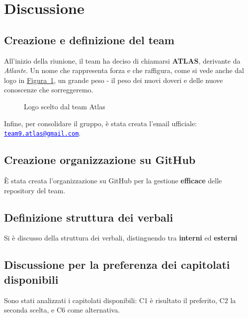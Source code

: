 \documentclass[a4paper,12pt]{article}
\makeatletter
\newcommand{\Email}{\href{mailto:team9.atlas@gmail.com}{\textcolor{blue}{\underline{team9.atlas@gmail.com}}}}
\newcommand{\LogoGruppo}{img/AtlasLogo.png} %
\makeatother
\begin{document}
\section{Discussione}{
    \subsection{Creazione e definizione del team}{
        All'inizio della riunione, il team ha deciso di chiamarsi \textbf{ATLAS}, derivante da \emph{Atlante}.  
        Un nome che rappresenta forza e che raffigura, come si vede anche dal logo in \hyperlink{logo-target}{Figura~\ref{fig:logo-atlas}}, un grande peso - il peso dei nuovi doveri e delle nuove conoscenze che sorreggeremo.

        \begin{figure}[h]
            \centering
            \hypertarget{logo-target}{}
            \caption{Logo scelto dal team Atlas}
            \label{fig:logo-atlas}
        \end{figure}

        Infine, per consolidare il gruppo, è stata creata l'email ufficiale: \texttt{\Email}.
        }

        \subsection{Creazione organizzazione su GitHub}{
        È stata creata l'organizzazione su GitHub per la gestione \textbf{efficace} delle repository del team. 
        }

        \subsection{Definizione struttura dei verbali}{
        Si è discusso della struttura dei verbali, distinguendo tra \textbf{interni} ed \textbf{esterni}
        }

        \subsection{Discussione per la preferenza dei capitolati disponibili}{
        Sono stati analizzati i capitolati disponibili: C1 è risultato il preferito, C2 la seconda scelta, e C6 come alternativa.  
        }

}
\end{document}
